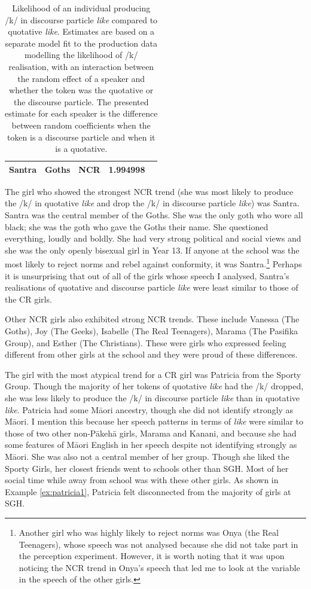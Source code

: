 \begin{table}[htbp]
\begin{center}
\begin{tabular}{lrrrr}
Santra	& Goths     & NCR    & 1.994998\\
   \hline
\end{tabular}
\caption{Likelihood of an individual producing /k/ in discourse particle \textit{like} compared to quotative \textit{like}.  Estimates are based on a separate model fit to the production data modelling the likelihood of /k/ realisation, with an interaction between the random effect of a speaker and whether the token was the quotative or the discourse particle.  The presented estimate for each speaker is the difference between random coefficients when the token is a discourse particle and when it is a quotative.}
\label{tab:indiv}
\end{center}
\end{table}


The girl who showed the strongest NCR trend (she was most likely to produce the /k/ in quotative \textit{like} and drop the /k/ in discourse particle \textit{like}) was Santra.  Santra was the central member of the Goths.  She was the only goth who wore all black; she was the goth who gave the Goths their name.  She questioned everything, loudly and boldly.  She had very strong political and social views and she was the only openly bisexual girl in Year 13.  If anyone at the school was the most likely to reject norms and rebel against conformity, it was Santra.\footnote{Another girl who was highly likely to reject norms was Onya (the Real Teenagers), whose speech was not analysed because she did not take part in the perception experiment.  However, it is worth noting that it was upon noticing the NCR trend in Onya's speech that led me to look at the variable in the speech of the other girls.}  Perhaps it is unsurprising that out of all of the girls whose speech I analysed, Santra's realisations of quotative and discourse particle \textit{like} were least similar to those of the CR girls.

Other NCR girls also exhibited strong NCR trends.  These include Va\-nessa (The Goths), Joy (The Geeks), Isa\-belle (The Real Teen\-agers), Ma\-rama (The Pasifika Group), and Esther (The Christians).  These were girls who expressed feeling different from other girls at the school and they were proud of these differences. 

The girl with the most atypical trend for a CR girl was Patricia from the Sporty Group.  Though the majority of her tokens of quotative \textit{like} had the /k/ dropped, she was less likely to produce the /k/ in discourse particle \textit{like} than in quotative \textit{like}.  Patricia had some M\=aori ancestry, though she did not identify strongly as M\=aori.  I mention this because her speech patterns in terms of \textit{like} were similar to those of two other non-P\=akeh\=a girls, Marama and Kanani, and because she had some features of M\=aori English in her speech despite not identifying strongly as M\=aori.  She was also not a central member of her group.  Though she liked the Sporty Girls, her closest friends went to schools other than SGH.  Most of her social time while away from school was with these other girls.  As shown in Example \ref{ex:patricia1}, Patricia felt disconnected from the majority of girls at SGH.


